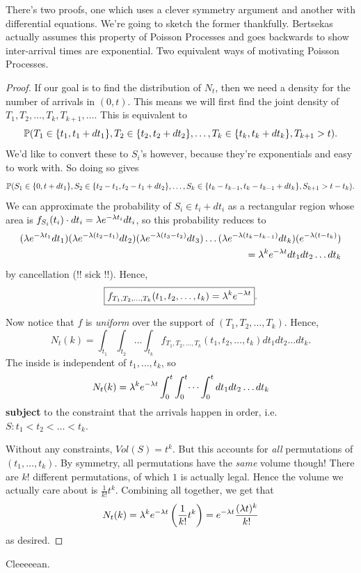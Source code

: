 \documentclass[11 pt]{scrartcl}
\begin{document}
There's two proofs, one which uses a clever symmetry argument and another with differential equations. We're going to sketch the former thankfully. Bertsekas actually assumes this property of Poisson Processes and goes backwards to show inter-arrival times are exponential. Two equivalent ways of motivating Poisson Processes. 
\begin{proof}
    If our goal is to find the distribution of $N_t$, then we need a density for the number of arrivals in $(0,t)$. This means we will first find the joint density of $T_1, T_2, \dots, T_k, T_{k+1}, \dots$. This is equivalent to 
    \[ \mathbb P(T_1 \in \{t_1, t_1 + dt_1\}, T_2\in\{t_2, t_2 + dt_2\}, \dots, T_k\in\{t_k, t_k + dt_k\}, T_{k+1} > t).\] 
    We'd like to convert these to $S_i$'s however, because they're exponentials and easy to work with. So doing so gives 
    \[ \mathbb P(S_1 \in \{0, t + dt_1\}, S_2 \in\{ t_2 - t_1, t_2-t_1+dt_2\}, \dots, S_k\in\{t_k-t_{k-1}, t_k-t_{k-1}+dt_k\}, S_{k+1} > t-t_k).\] 
    We can approximate the probability of $S_i \in t_i + dt_i$ as a rectangular region whose area is $f_{S_i}(t_i)\cdot dt_i = \lambda e^{-\lambda t_i} dt_i$, so this probability reduces to 
\begin{align*}
    (\lambda e^{-\lambda t_1} dt_1)(\lambda e^{-\lambda (t_2-t_1)}dt_2)(\lambda e^{-\lambda (t_3 - t_2)}dt_3)\dots (\lambda e^{-\lambda (t_k-t_{k-1})}dt_k) (e^{-\lambda(t-t_k)}) \\ 
    = \lambda^k e^{-\lambda t} dt_1 dt_2 \dots dt_k 
\end{align*}
by cancellation (!! sick !!). Hence, 
\[ \boxed{f_{T_1, T_2, \dots, T_k}(t_1, t_2, \dots, t_k) = \lambda^k e^{-\lambda t}}.\] 

Now notice that $f$ is \emph{uniform} over the support of $(T_1, T_2, \dots, T_k)$. Hence, 
\[ N_t(k) = \int_{t_1}\int_{t_2}\dots \int_{t_k} f_{T_1, T_2, \dots, T_k}(t_1, t_2, \dots, t_k) dt_1dt_2\dots dt_k.\] 
The inside is independent of $t_1, \dots, t_k$, so 
\[ N_t(k) = \lambda^k e^{-\lambda t} \int_0^t \int_0^t \dots \int_0^t dt_1dt_2\dots dt_k\] 
\textbf{subject} to the constraint that the arrivals happen in order, i.e. $S: t_1 < t_2 < \dots < t_k$. 

Without any constraints, $Vol(S) = t^k$. But this accounts for \emph{all} permutations of $(t_1, \dots, t_k)$. By symmetry, all permutations have the \emph{same} volume though! There are $k!$ different permutations, of which $1$ is actually legal. Hence the volume we actually care about is $\frac{1}{k!} t^k$. Combining all together, we get that 
\[ N_t(k) = \lambda^k e^{-\lambda t} \left(\dfrac{1}{k!}t^k\right) = e^{-\lambda t} \dfrac{(\lambda t)^k}{k!}\] 
as desired. 
\end{proof}
Cleeeeean. 
\end{document}
